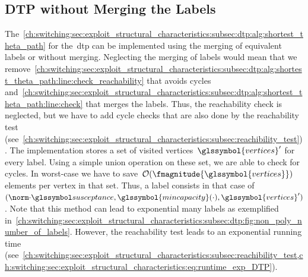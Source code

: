 \subsection{DTP without Merging the Labels}
\label{ch:switching:sec:exploit_structural_characteristics:subsec:DTP_without_label_merging}
% 
The~\cref{ch:switching:sec:exploit_structural_characteristics:subsec:dtp:alg:shortest_theta_path}
for the~\gls{dtp} can be implemented using the merging of equivalent labels or
without merging. Neglecting the merging of labels would mean that we
remove~\cref{ch:switching:sec:exploit_structural_characteristics:subsec:dtp:alg:shortest_theta_path:line:check_reachability}
that avoids cycles
and~\cref{ch:switching:sec:exploit_structural_characteristics:subsec:dtp:alg:shortest_theta_path:line:check}
that merges the labels. Thus, the reachability check is neglected, but we have
to add cycle checks that are also done by the reachability test
(see~\cref{ch:switching:sec:exploit_structural_characteristics:subsec:reachibility_test}).
The implementation stores a set of visited vertices~$\glssymbol{vertices}'$ for
every label. Using a simple union operation on these set, we are able to check
for cycles. In worst-case we have to
save~$\bigO(\fmagnitude{\glssymbol{vertices}})$ elements per vertex in that set.
Thus, a label consists in that case of~$(\bnorm{\cdot}, \glssymbol{mincapacity}
(\cdot),\glssymbol{vertices}')$. Note that this method can lead to exponential
many labels as exemplified
in~\cref{ch:switching:sec:exploit_structural_characteristics:subsec:dtp:fig:non_poly_number_of_labels}.
However, the reachability test leads to an exponential running time
(see~\cref{ch:switching:sec:exploit_structural_characteristics:subsec:reachibility_test,ch:switching:sec:exploit_structural_characteristics:eq:runtime_exp_DTP}).%
